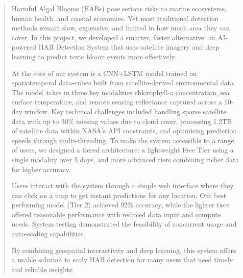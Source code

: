\documentclass[conference]{IEEEtran}
\begin{document}
\maketitle
\begin{abstract}

Harmful Algal Blooms (HABs) pose serious risks to marine ecosystems, human health, and coastal economies. Yet most traditional detection methods remain slow, expensive, and limited in how much area they can cover. In this project, we developed a smarter, faster alternative: an AI-powered HAB Detection System that uses satellite imagery and deep learning to predict toxic bloom events more effectively.

At the core of our system is a CNN+LSTM model trained on spatiotemporal data-cubes built from satellite-derived environmental data. The model takes in three key modalities chlorophyll-a concentration, sea surface temperature, and remote sensing reflectance captured across a 10-day window. Key technical challenges included handling sparse satellite data with up to 30\% missing values due to cloud cover, processing 1.2TB of satellite data within NASA's API constraints, and optimising prediction speeds through multi-threading. To make the system accessible to a range of users, we designed a tiered architecture: a lightweight Free Tier using a single modality over 5 days, and more advanced tiers combining richer data for higher accuracy.

Users interact with the system through a simple web interface where they can click on a map to get instant predictions for any location. Our best performing model (Tier 2) achieved 92\% accuracy, while the lighter tiers offered reasonable performance with reduced data input and compute needs. System testing demonstrated the feasibility of concurrent usage and auto-scaling capabilities.

By combining geospatial interactivity and deep learning, this system offers a usable solution to early HAB detection for many users that need timely and reliable insights.
\end{abstract}

\end{document}
